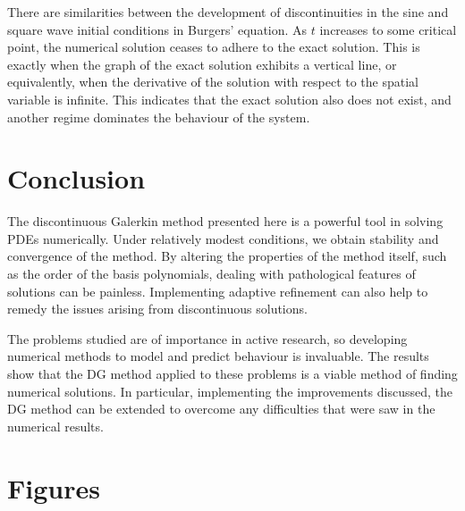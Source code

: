 There are similarities between the development of discontinuities in the sine and square wave initial conditions in Burgers' equation.
As $t$ increases to some critical point, the numerical solution ceases to adhere to the exact solution.
This is exactly when the graph of the exact solution exhibits a vertical line, or equivalently, when the derivative of the solution with respect to the spatial variable is infinite.
This indicates that the exact solution also does not exist, and another regime dominates the behaviour of the system.




\section{Conclusion}

The discontinuous Galerkin method presented here is a powerful tool in solving PDEs numerically.
Under relatively modest conditions, we obtain stability and convergence of the method.
By altering the properties of the method itself, such as the order of the basis polynomials, dealing with pathological features of solutions can be painless.
Implementing adaptive refinement can also help to remedy the issues arising from discontinuous solutions.

The problems studied are of importance in active research, so developing numerical methods to model and predict behaviour is invaluable.
The results show that the DG method applied to these problems is a viable method of finding numerical solutions.
In particular, implementing the improvements discussed, the DG method can be extended to overcome any difficulties that were saw in the numerical results.


{}


\clearpage
\appendix

\section{Figures}

\newcommand{\labelplotone}[3]{Plot of the numerical and exact solutions of the advection equation with the sine wave initial condition defined in equation \eqref{eq:sine}, at time $t=#1$, with $N=#2$ grid points, using a time step of $\Delta t =$#3.}

